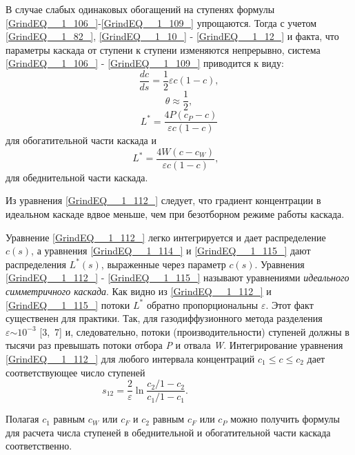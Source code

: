 В случае слабых одинаковых обогащений на ступенях формулы \ref{GrindEQ__1_106_}-\ref{GrindEQ__1_109_} упрощаются. Тогда с учетом \ref{GrindEQ__1_82_}, \ref{GrindEQ__1_10_} - \ref{GrindEQ__1_12_} и факта, что параметры каскада от ступени к ступени изменяются непрерывно, система \ref{GrindEQ__1_106_} - \ref{GrindEQ__1_109_} приводится к виду:
\begin{equation} \label{GrindEQ__1_112_} 
\frac{dc}{ds} =\frac{1}{2} \varepsilon c(1-c), 
\end{equation} 
\begin{equation} \label{GrindEQ__1_113_} 
\theta \approx \frac{1}{2} , 
\end{equation} 
\begin{equation} \label{GrindEQ__1_114_} 
L^{*} =\frac{4P(c_{P} -c)}{\varepsilon c(1-c)}  
\end{equation} 
для обогатительной части каскада и
\begin{equation} \label{GrindEQ__1_115_} 
L^{*} =\frac{4W(c-c_{W} )}{\varepsilon c(1-c)} ,~~~                              
\end{equation} 
для обеднительной части каскада.

Из уравнения \ref{GrindEQ__1_112_} следует, что градиент концентрации в идеальном каскаде вдвое меньше, чем при безотборном режиме работы каскада.

Уравнение \ref{GrindEQ__1_112_} легко интегрируется и дает распределение $c(s)$, а уравнения \ref{GrindEQ__1_114_} и \ref{GrindEQ__1_115_} дают распределения $L^{*} (s)$, выраженные через параметр $c(s)$.  Уравнения \ref{GrindEQ__1_112_} - \ref{GrindEQ__1_115_} называют уравнениями \textit{идеального симметричного каскада}. Как видно из \ref{GrindEQ__1_112_} и \ref{GrindEQ__1_115_} потоки $L^{*} $ обратно пропорциональны $\varepsilon $. Этот факт существенен для практики. Так, для газодиффузионного метода разделения $\varepsilon {\sim 10}^{{-3}} $ [3,~7] и, следовательно, потоки (производительности) ступеней должны в тысячи раз превышать потоки отбора \textit{P} и отвала \textit{W}. Интегрирование уравнения \ref{GrindEQ__1_112_} для любого интервала концентраций $c_{1} \le c\le c_{2} $ дает соответствующее число ступеней
\begin{equation} \label{GrindEQ__1_116_} 
s_{12} =\frac{2}{\varepsilon } \ln \frac{c_{2} /1-c_{2} }{c_{1} /1-c_{1} } . ~~~~~~~~~~~~~~~~~~~~~~~~~~~~ ~~~~ 
\end{equation} 

Полагая $c_{1} $ равным $c_{W} $ или $c_{F} $ и $c_{2} $ равным $c_{F} $ или $c_{P} $ можно получить формулы для расчета числа ступеней в обеднительной и обогатительной части каскада соответственно.

